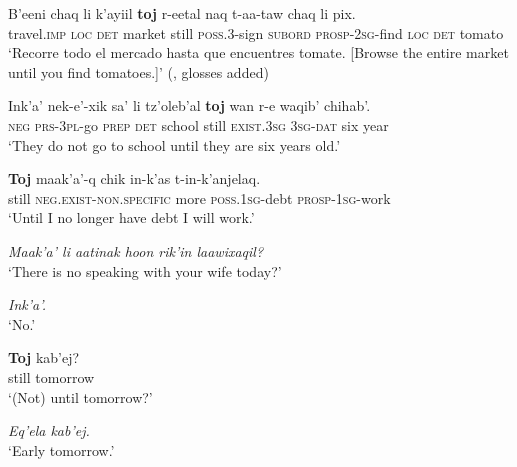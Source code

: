 \begin{exe}
	\ex\label{exAppendixKekchiTemporalLimitBrowseMarket}
	\gll B’eeni chaq li k’ayiil \textbf{toj} r-eetal naq t-aa-taw chaq li pix.\\
	travel.\textsc{imp} \textsc{loc} \textsc{det} market still \textsc{poss}.3-sign \textsc{subord} \textsc{prosp}-2\textsc{sg}-find \textsc{loc} \textsc{det} tomato\\
	\glt \lq Recorre todo el mercado hasta que encuentres tomate. [Browse the entire market until you find tomatoes.]' (\cite[46]{VocabularioKechi2004}, glosses added)

	\ex\label{exAppendixKekchiSchoolNeg}
	\gll Ink'a' nek-e'-xik sa' li tz'oleb'al \textbf{toj} wan r-e waqib' chihab'.\\
	\textsc{neg} \textsc{prs}-3\textsc{pl}-go \textsc{prep} \textsc{det} school still \textsc{exist}.3\textsc{sg} 3\textsc{sg}-\textsc{dat} six year\\
	\glt \lq They do not go to school until they are six years old.\rq{ }\parencite[466]{Kockelman2020}

	\ex\label{AppendixKekchiTemporalLimitDebt}
	\gll \textbf{Toj} maak’a’-q chik in-k’as t-in-k’anjelaq.\\
	still \textsc{neg}.\textsc{exist}-\textsc{non}.\textsc{specific} more \textsc{poss}.1\textsc{sg}-debt \textsc{prosp}-1\textsc{sg}-work\\
	\glt \lq Until I no longer have debt I will work.\rq{ }\parencite[480]{Kockelman2020}

	\ex\label{exAppendixKekchiTemporalLimitWife}
	\begin{xlist}
		\textit{Maak'a' li aatinak hoon rik'in laawixaqil?}\\
		\lq There is no speaking with your wife today?\rq
		
		\textit{Ink'a'.}\\
		\lq No.'
		
		\gll \textbf{Toj} kab'ej?\\
		still tomorrow\\
		\glt \lq (Not) until tomorrow?'
		
		\textit{Eq'ela kab'ej.}\\
		\glt \lq Early tomorrow.' \parencite[465]{Kockelman2020}
	\end{xlist}
\end{exe}

